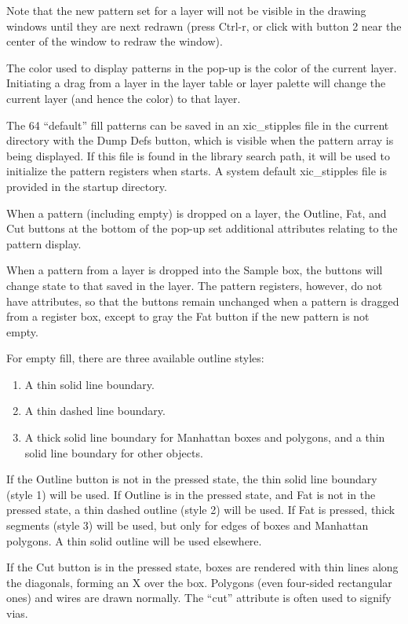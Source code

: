Note that the new pattern set for a layer will not be visible in the
drawing windows until they are next redrawn (press {\kb Ctrl-r}, or
click with button 2 near the center of the window to redraw the
window).

The color used to display patterns in the pop-up is the color of the
current layer.  Initiating a drag from a layer in the layer table or
layer palette will change the current layer (and hence the color) to
that layer.

The 64 ``default'' fill patterns can be saved in an {\vt xic\_stipples}
file in the current directory with the {\cb Dump Defs} button, which
is visible when the pattern array is being displayed.  If this file is
found in the library search path, it will be used to initialize the
pattern registers when {\Xic} starts.  A system default {\vt
xic\_stipples} file is provided in the startup directory.

When a pattern (including empty) is dropped on a layer, the {\cb
Outline}, {\cb Fat}, and {\cb Cut} buttons at the bottom of the pop-up
set additional attributes relating to the pattern display.

When a pattern from a layer is dropped into the {\cb Sample} box, the
buttons will change state to that saved in the layer.  The pattern
registers, however, do not have attributes, so that the buttons remain
unchanged when a pattern is dragged from a register box, except to
gray the {\cb Fat} button if the new pattern is not empty.

For empty fill, there are three available outline styles:
\begin{enumerate}
\item{A thin solid line boundary.}
\item{A thin dashed line boundary.}
\item{A thick solid line boundary for Manhattan boxes and polygons,
and a thin solid line boundary for other objects.}
\end{enumerate}

If the {\cb Outline} button is not in the pressed state, the thin
solid line boundary (style 1) will be used.  If {\cb Outline} is in
the pressed state, and {\cb Fat} is not in the pressed state, a thin
dashed outline (style 2) will be used.  If {\cb Fat} is pressed, thick
segments (style 3) will be used, but only for edges of boxes and
Manhattan polygons.  A thin solid outline will be used elsewhere.

If the {\cb Cut} button is in the pressed state, boxes are rendered
with thin lines along the diagonals, forming an X over the box. 
Polygons (even four-sided rectangular ones) and wires are drawn
normally.  The ``cut'' attribute is often used to signify vias.

